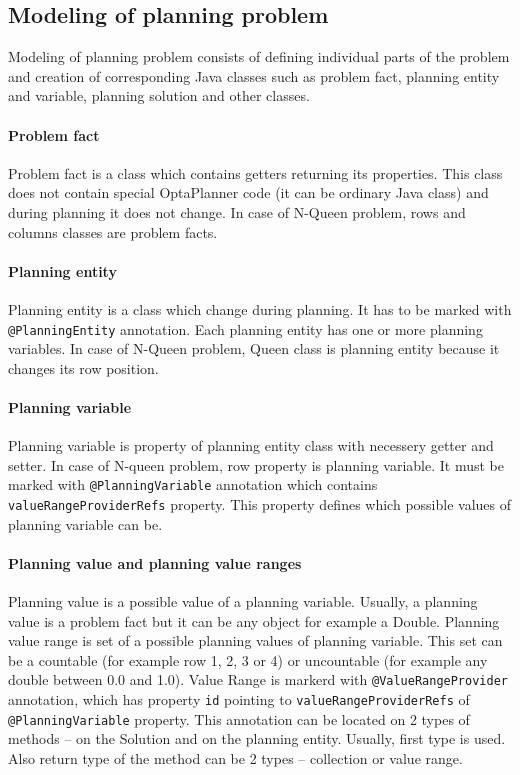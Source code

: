 \subsection{Modeling of planning problem}
Modeling of planning problem consists of defining individual parts of the problem and creation of corresponding Java classes such as problem fact, planning entity and variable, planning solution and other classes.

\paragraph{Problem fact}
Problem fact is a class which contains getters returning its properties. This class does not contain special OptaPlanner code (it can be ordinary Java class) and during planning it does not change. In case of N-Queen problem, rows and columns classes are problem facts.

\paragraph{Planning entity}
Planning entity is a class which change during planning. It has to be marked with \texttt{@PlanningEntity} annotation. Each planning entity has one or more planning variables. In case of N-Queen problem, Queen class is planning entity because it changes its row position.

\paragraph{Planning variable}
Planning variable is property of planning entity class with necessery getter and setter. In case of N-queen problem, row property is planning variable. It must be marked with \texttt{@PlanningVariable} annotation which contains \texttt{valueRangeProviderRefs} property. This property defines which possible values of planning variable can be.

\paragraph{Planning value and planning value ranges}
Planning value is a possible value of a planning variable. Usually, a planning value is a problem fact but it can be any object for example a Double. Planning value range is set of a possible planning values of planning variable. This set can be a countable (for example row 1, 2, 3 or 4) or uncountable (for example any double between 0.0 and 1.0). Value Range is markerd with \texttt{@ValueRangeProvider} annotation, which has property \texttt{id} pointing to \texttt{valueRangeProviderRefs} of \texttt{@PlanningVariable} property. This annotation can be located on 2 types of methods -- on the Solution and on the planning entity. Usually, first type is used. Also return type of the method can be 2 types -- collection or value range.

